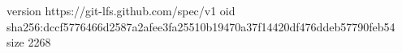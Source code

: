 version https://git-lfs.github.com/spec/v1
oid sha256:dccf5776466d2587a2afee3fa25510b19470a37f14420df476ddeb57790feb54
size 2268
